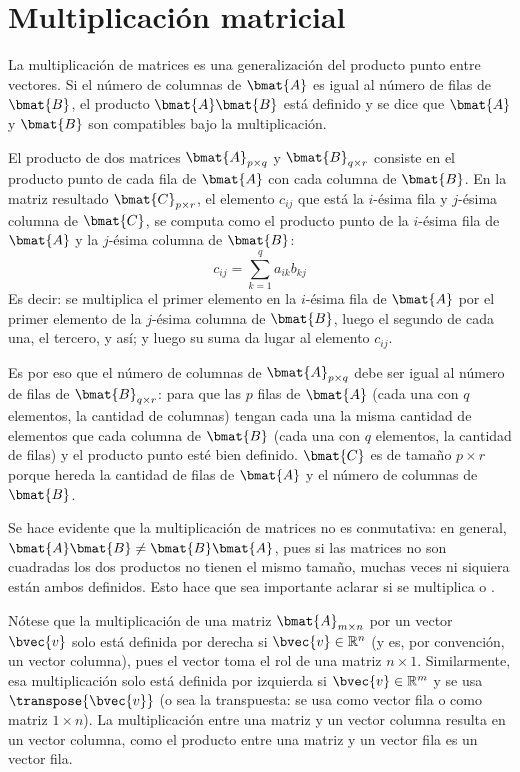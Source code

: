 \section{Multiplicación matricial} \label{apx:multiplicacion_matricial}

La multiplicación de matrices es una generalización del producto punto entre vectores. Si el número de columnas de \( \bmat{A} \) es igual al número de filas de \( \bmat{B} \), el producto \( \bmat{A}\bmat{B} \) está definido y se dice que \( \bmat{A} \) y  \( \bmat{B} \) son compatibles bajo la multiplicación. 

El producto de dos matrices \( \bmat{A}_{p \times q} \) y \( \bmat{B}_{q \times r} \) consiste en el producto punto de cada fila de \( \bmat{A} \) con cada columna de \( \bmat{B} \). En la matriz resultado $\bmat{C}_{p \times r}$, el elemento $c_{ij}$ que está la $i$-ésima fila y $j$-ésima columna de $\bmat{C}$, se computa como el producto punto de la $i$-ésima fila de $\bmat{A}$ y la $j$-ésima columna de $\bmat{B}$:
\[c_{ij} = \sum_{k = 1}^{q} a_{ik} b_{kj}\]
Es decir: se multiplica el primer elemento en la $i$-ésima fila de $\bmat{A}$ por el primer elemento de la $j$-ésima columna de $\bmat{B}$, luego el segundo de cada una, el tercero, y así; y luego su suma da lugar al elemento $c_{ij}$. 

Es por eso que el número de columnas de $\bmat{A}_{p\times q}$ debe ser igual al número de filas de $\bmat{B}_{q \times r}$: para que las $p$ filas de $\bmat{A}$ (cada una con $q$ elementos, la cantidad de columnas) tengan cada una la misma cantidad de elementos que cada columna de $\bmat{B}$ (cada una con $q$ elementos, la cantidad de filas) y el producto punto esté bien definido. $\bmat{C}$ es de tamaño $p\times r$ porque hereda la cantidad de filas de $\bmat{A}$ y el número de columnas de $\bmat{B}$.

Se hace evidente que la multiplicación de matrices no es conmutativa: en general, $\bmat{A} \bmat{B} \neq \bmat{B} \bmat{A}$, pues si las matrices no son cuadradas los dos productos no tienen el mismo tamaño, muchas veces ni siquiera están ambos definidos. Esto hace que sea importante aclarar si se multiplica  o .

Nótese que la multiplicación de una matriz \( \bmat{A}_{m \times n} \) por un vector \( \bvec{v} \) solo está definida por derecha si \(\bvec{v} \in \mathbb{R}^{n}\) (y es, por convención, un vector columna), pues el vector toma el rol de una matriz $n\times 1$. Similarmente, esa multiplicación solo está definida por izquierda si \(\bvec{v} \in \mathbb{R}^{m}\) y se usa \(\transpose{\bvec{v}}\) (o sea la transpuesta: se usa como vector fila o como matriz  $1\times n$). La multiplicación entre una matriz y un vector columna resulta en un vector columna, como el producto entre una matriz y un vector fila es un vector fila.

